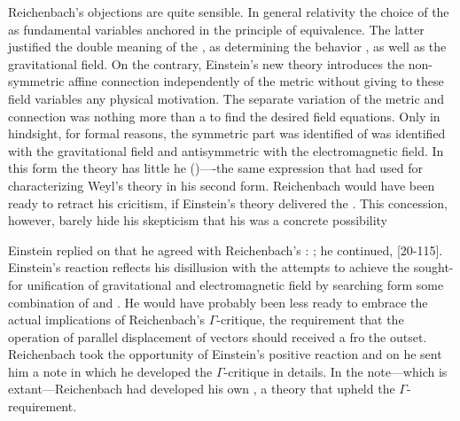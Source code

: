 \documentclass[draft]{article}
\begin{document}
Reichenbach's objections are quite sensible. In general relativity the choice of the \gmn as fundamental variables anchored in the principle of equivalence. The latter justified the double meaning of the \gmn, as determining the behavior \rac, as well as the gravitational field. On the contrary, Einstein's new theory introduces the non-symmetric affine connection \Gtmn independently of the metric \gmn without giving to these field variables any physical motivation. The separate variation of the metric and connection was nothing more than a  to find the desired field equations. Only in hindsight, for formal reasons, the symmetric part was identified of \gmn was identified with the gravitational field and antisymmetric with the electromagnetic field. In this form the theory has little he  ()----the same expression that \citet[367]{Reichenbach1921} had used for characterizing Weyl's theory in his second form. Reichenbach would have been ready to retract his cricitism, if Einstein's theory delivered the . This concession, however, barely hide his skepticism that his was a concrete possibility 

Einstein replied on   that he agreed with Reichenbach's : ;  he continued,  [20-115]. Einstein's reaction reflects his disillusion with the attempts to achieve the sought-for unification of gravitational and electromagnetic field by searching form some combination of \Gtmn and \gmn. He would have probably been less ready to embrace the actual implications of Reichenbach's $\Gamma$-critique, the requirement that the operation of parallel displacement of vectors should received a  fro the outset. Reichenbach took the opportunity of Einstein's positive reaction and on  he sent him a note in which he developed the $\Gamma$-critique in details. In the note---which is extant---Reichenbach had developed his own \uft, a theory that upheld the $\Gamma$-requirement.
\end{document}
